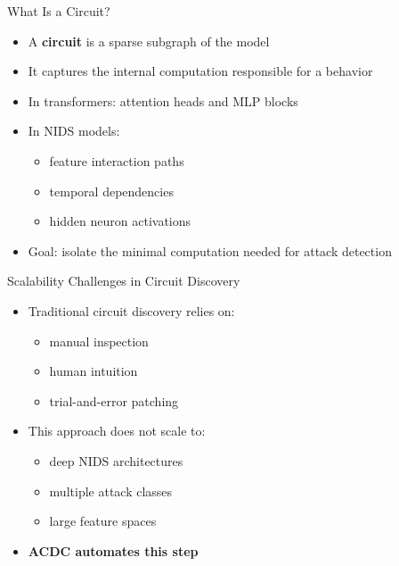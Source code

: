 \documentclass{beamer}
\begin{document}
	\begin{frame}{What Is a Circuit?}
		\begin{itemize}
			\item A \textbf{circuit} is a sparse subgraph of the model
			\item It captures the internal computation responsible for a behavior
			\item In transformers: attention heads and MLP blocks
			\item In NIDS models:
			\begin{itemize}
				\item feature interaction paths
				\item temporal dependencies
				\item hidden neuron activations
			\end{itemize}
			\item Goal: isolate the minimal computation needed for attack detection
		\end{itemize}
	\end{frame}
	
	\begin{frame}{Scalability Challenges in Circuit Discovery}
		\begin{itemize}
			\item Traditional circuit discovery relies on:
			\begin{itemize}
				\item manual inspection
				\item human intuition
				\item trial-and-error patching
			\end{itemize}
			\item This approach does not scale to:
			\begin{itemize}
				\item deep NIDS architectures
				\item multiple attack classes
				\item large feature spaces
			\end{itemize}
			\item \textbf{ACDC automates this step}
		\end{itemize}
	\end{frame}
	
\end{document}
